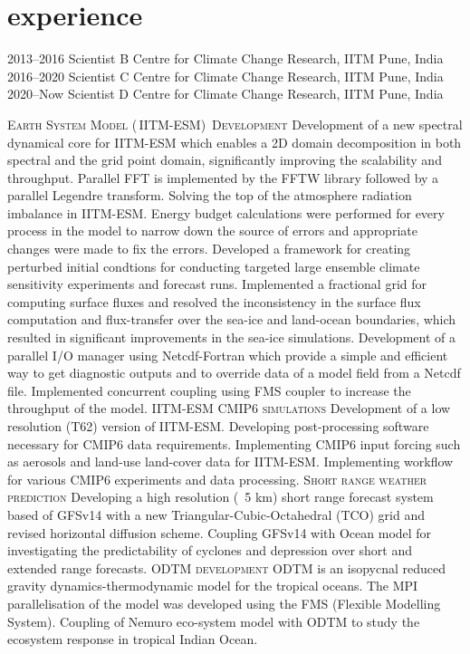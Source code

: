 \documentclass[]{cv-style}          %
\begin{document}
\section{experience}
\begin{exprlist}
  \expr
  {2013--2016}
  {Scientist B}
  {Centre for Climate Change Research, IITM Pune, India}
  \expr
  {2016--2020}
  {Scientist C}
  {Centre for Climate Change Research, IITM Pune, India}
  \expr
  {2020--Now}
  {Scientist D}
  {Centre for Climate Change Research, IITM Pune, India}
\end{exprlist}
\begin{outline}
    \1 \textsc{Earth System Model (\,IITM-ESM)\, Development}
        \2 Development of a new spectral dynamical core for IITM-ESM which enables a 2D domain decomposition in both spectral and the grid point domain, significantly improving the scalability and throughput. Parallel FFT is implemented by the FFTW library followed by a parallel Legendre transform.
        \2 Solving the top of the atmosphere radiation imbalance in IITM-ESM. Energy budget calculations were performed for every process in the model to narrow down the source of errors and appropriate changes were made to fix the errors.
        \2 Developed a framework for creating perturbed initial condtions for conducting targeted large ensemble climate sensitivity experiments and forecast runs.
        \2 Implemented a fractional grid for computing surface fluxes and resolved the inconsistency in the surface flux computation and flux-transfer over the sea-ice and land-ocean boundaries, which resulted in significant improvements in the sea-ice simulations.
        \2 Development of a parallel I/O manager using Netcdf-Fortran which provide a simple and efficient way to get diagnostic outputs and to override data of a model field from a Netcdf file.
        \2 Implemented concurrent coupling using FMS coupler to increase the throughput of the model.
    \1 \textsc{IITM-ESM CMIP6 simulations}
        \2 Development of a low resolution (T62) version of IITM-ESM.
        \2 Developing post-processing software necessary for CMIP6 data requirements.
        \2 Implementing CMIP6 input forcing such as aerosols and land-use land-cover data for IITM-ESM.
        \2 Implementing workflow for various CMIP6 experiments and data processing.
    \1 \textsc{Short range weather prediction}
        \2 Developing a high resolution (~5 km) short range forecast system based of GFSv14 with a new Triangular-Cubic-Octahedral (TCO) grid and revised horizontal diffusion scheme.
        \2 Coupling GFSv14 with Ocean model for investigating the predictability of cyclones and depression over short and extended range forecasts.
    \1 \textsc{ODTM development}
        \2 ODTM is an isopycnal reduced gravity dynamics-thermodynamic model for the tropical oceans. The MPI parallelisation of the model was developed using the FMS (Flexible Modelling System).
        \2 Coupling of Nemuro eco-system model with ODTM to study the ecosystem response in tropical Indian Ocean.
    

\end{outline}
\end{document}
